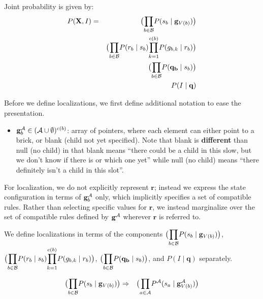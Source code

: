 \documentclass[11pt]{article}
\newcommand{\Active}{{\cal A}}
\newcommand{\X}{\mathbf{X}}
\begin{document}
\FloatBarrier

Joint probability is given by: \\

\begin{eqnarray}
P(\X, I) &=& \big({\displaystyle \prod_{b \in {\cal B}}} P(s_b \mid \mathbf{g}_{V(b)}) \big ) \\
& &\big( {\displaystyle \prod_{b \in {\cal B}}} P(r_b \mid s_b) {\displaystyle \prod_{k=1}^{c(b)}} P(g_{b,k} \mid r_b) \big) \\
& &\big( {\displaystyle \prod_{b \in {\cal B}}} P(\mathbf{q_b} \mid s_b)\big) \\
& & P(I \mid \mathbf{q})
\end{eqnarray}

Before we define localizations, we first define additional notation to ease the presentation.

\begin{itemize}
\item $\mathbf{g}_b^{\Active} \in ( {\cal A} \cup \emptyset )^{c(b)}$: array of pointers, where each element can either point to a brick, or blank (child not yet specified). Note that blank is \textbf{different} than null (no child) in that blank means ``there could be a child in this slow, but we don't know if there is or which one yet'' while null (no child) means ``there definitely isn't a child in this slot''.
\end{itemize}

For localization, we do not explicitly represent $\mathbf{r}$; instead we express the state configuration in terms of $\mathbf{g}_b^{\Active}$ only, which implicitly specifies a set of compatible rules. Rather than selecting specific values for $\mathbf{r}$, we instead marginalize over the set of compatible rules defined by $\mathbf{g^{\Active}}$ wherever  $\mathbf{r}$ is referred to.

We define localizations in terms of the components $\big({\displaystyle \prod_{b \in {\cal B}}} P(s_b \mid \mathbf{g}_{V(b)}) \big )$, $\big( {\displaystyle \prod_{b \in {\cal B}}} P(r_b \mid s_b) {\displaystyle \prod_{k=1}^{c(b)}} P(g_{b,k} \mid r_b) \big)$, $\big( {\displaystyle \prod_{b \in {\cal B}}} P(\mathbf{q_b} \mid s_b)\big)$, and $P(I \mid \mathbf{q})$ separately.

\begin{eqnarray}
\big({\displaystyle \prod_{b \in {\cal B}}} P(s_b \mid \mathbf{g}_{V(b)}) \big ) &\Rightarrow& \big({\displaystyle \prod_{a \in {\cal A}}} P^{\Active}(s_a \mid \mathbf{g}^{\Active}_{V({b})}) \big )
\end{eqnarray}
\end{document}

